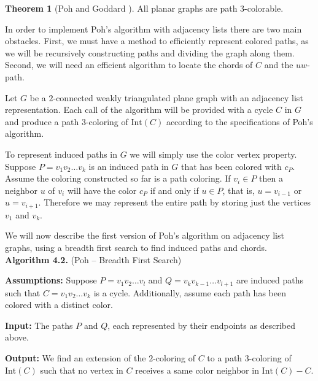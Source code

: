\documentclass[letterpaper, 12pt]{article}
\theoremstyle{definition}
\theoremstyle{definition}
\theoremstyle{thm}
\newtheorem{theorem}{Theorem}[section]
\theoremstyle{definition}
\begin{document}
\begin{theorem}[Poh \cite{poh} and Goddard \cite{goddard}]
All planar graphs are path $3$-colorable.
\end{theorem}

In order to implement Poh's algorithm with adjacency lists there are two main
obstacles. First, we must have a method to efficiently represent colored paths,
as we will be recursively constructing paths and dividing the graph along them.
Second, we will need an efficient algorithm to locate the chords of $C$ and the
$uw$-path.

Let $G$ be a $2$-connected weakly triangulated plane graph with an adjacency
list representation. Each call of the algorithm will be provided with a cycle
$C$ in $G$ and produce a path $3$-coloring of $\text{Int}(C)$ according to the
specifications of Poh's algorithm.

To represent induced paths in $G$ we will simply use the color vertex property.
Suppose $P=v_1v_2\ldots v_k$ is an induced path in $G$ that has been colored
with $c_P$. Assume the coloring constructed so far is a path coloring. If
$v_i\in P$ then a neighbor $u$ of $v_i$ will have the color $c_P$ if and only if
$u\in P$, that is, $u=v_{i-1}$ or $u=v_{i+1}$. Therefore we may represent the
entire path by storing just the vertices $v_1$ and $v_k$. 

We will now describe the first version of Poh's algorithm on adjacency list
graphs, using a breadth first search to find induced paths and chords.\\

\noindent\textbf{Algorithm 4.2.} (Poh -- Breadth First Search)

\noindent\textbf{Assumptions:} Suppose $P=v_1v_2\ldots v_l$ and
$Q=v_kv_{k-1}\ldots v_{l+1}$ are induced
paths such that $C=v_1v_2\ldots v_k$ is a cycle. Additionally, assume each
path has been colored with a distinct color.

\noindent\textbf{Input:} The paths $P$ and $Q$, each represented by their
endpoints as described above.

\noindent\textbf{Output:} We find an extension of the $2$-coloring of $C$ to
a path $3$-coloring of $\text{Int}(C)$ such that
no vertex in $C$ receives a same color neighbor in $\text{Int}(C)-C$.
\end{document}
